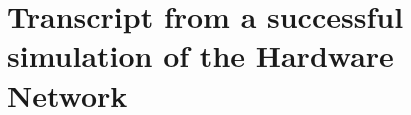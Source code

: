 \chapter{Transcript from a successful simulation of the Hardware Network} \label{ap1:transcript-cmd}



